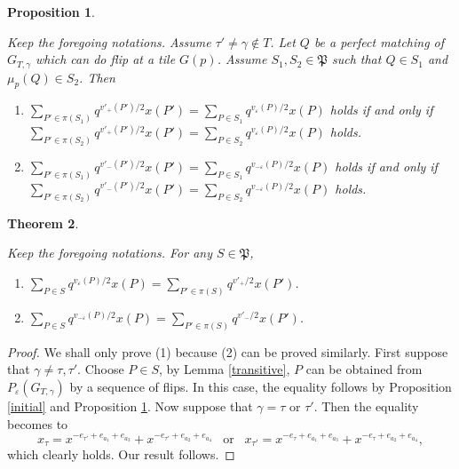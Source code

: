 \documentclass[10pt]{amsart}
\theoremstyle{theorems}
\newtheorem{Theorem}{Theorem}[section]
\newtheorem{Proposition}[Theorem]{Proposition}
\begin{document}
\begin{Proposition}\label{all}

Keep the foregoing notations. Assume $\tau'\neq \gamma\notin T$. Let $Q$ be a perfect matching of $G_{T,\gamma}$ which can do flip at a tile $G(p)$. Assume $S_1,S_2\in \mathfrak P$ such that $Q\in S_1$ and $\mu_{p}(Q)\in S_2$. Then

\begin{enumerate}[$(1)$]

  \item $\sum_{P'\in \pi(S_1)}q^{v'_{+}(P')/2}x(P')=\sum_{P\in S_1}q^{v_{\varepsilon}(P)/2}x(P)$ holds if and only if\\
   $\sum_{P'\in \pi(S_2)}q^{v'_{+}(P')/2}x(P')=\sum_{P\in S_2}q^{v_{\varepsilon}(P)/2}x(P)$ holds.

  \item $\sum_{P'\in \pi(S_1)}q^{v'_{-}(P')/2}x(P')=\sum_{P\in S_1}q^{v_{-\varepsilon}(P)/2}x(P)$ holds if and only if\\
   $\sum_{P'\in \pi(S_2)}q^{v'_{-}(P')/2}x(P')=\sum_{P\in S_2}q^{v_{-\varepsilon}(P)/2}x(P)$ holds.

\end{enumerate}

\end{Proposition}

\medskip

\begin{Theorem}\label{mainpre}

Keep the foregoing notations. For any $S\in \mathfrak P$,

\begin{enumerate}[$(1)$]

  \item $\sum_{P\in S}q^{v_{\varepsilon}(P)/2}x(P)=\textstyle\sum_{P'\in \pi(S)}q^{v'_{+}/2}x(P')$.

  \item $\sum_{P\in S}q^{v_{-\varepsilon}(P)/2}x(P)=\textstyle\sum_{P'\in \pi(S)}q^{v'_{-}/2}x(P')$.

\end{enumerate}

\end{Theorem}

\begin{proof}

We shall only prove (1) because (2) can be proved similarly. First suppose that $\gamma\neq \tau,\tau'$. Choose $P\in S$, by Lemma \ref{transitive}, $P$ can be obtained from $P_{\varepsilon}(G_{T,\gamma})$ by a sequence of flips. In this case, the equality follows by Proposition \ref{initial} and Proposition \ref{all}. Now suppose that $\gamma=\tau$ or $\tau'$. Then the equality becomes to
$$x_\tau=x^{-e_{\tau'}+e_{a_1}+e_{a_3}}+x^{-e_{\tau'}+e_{a_2}+e_{a_4}}\;\;\;\text{or}\;\;\; x_{\tau'}=x^{-e_{\tau}+e_{a_1}+e_{a_3}}+x^{-e_{\tau}+e_{a_2}+e_{a_4}},$$
which clearly holds. Our result follows.
\end{proof}
\end{document}
